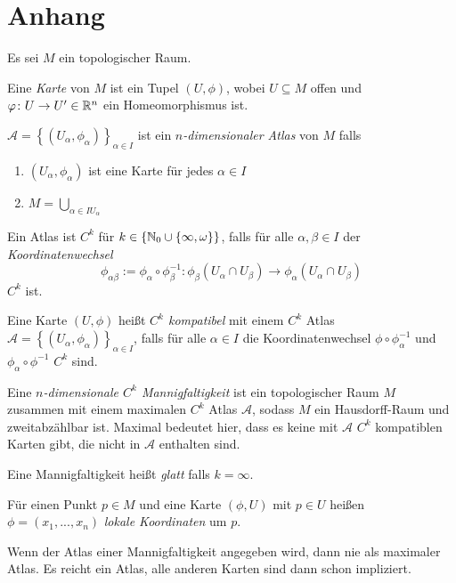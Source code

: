 \chapter{Anhang}

\begin{definition}
    \label{def: mannigfaltigkeit}
    Es sei $M$ ein topologischer Raum. 
    
    Eine \textit{Karte} von $M$ ist ein Tupel
    $(U, \phi)$, wobei $U \subseteq M$ offen und $\varphi \colon U \to U' \in { \mathbb R }^n$ 
    ein Homeomorphismus ist.

    $\mathcal{A} = \left\{ (U_{\alpha}, \phi_{\alpha}) \right\}_{\alpha \in I}$ ist ein 
    \textit{$n$-dimensionaler Atlas} von $M$ falls
    \begin{enumerate}
        \item $(U_{\alpha}, \phi_{\alpha})$ ist eine Karte für jedes $\alpha \in I$
        \item $M = \bigcup_{\alpha \in I U_{\alpha}}$
    \end{enumerate}
    Ein Atlas ist $C^k$ für $k \in \{ { \mathbb N }_0 \cup \{ \infty, \omega \} \}$, falls für
    alle $\alpha, \beta \in I$ der \textit{Koordinatenwechsel} 
    \[ 
        \phi_{\alpha \beta} := 
        \phi_{\alpha} \circ \phi_{\beta}^{-1} \colon 
        \phi_{\beta} (U_{\alpha} \cap U_{\beta}) \to \phi_{\alpha} (U_{\alpha} \cap U_{\beta})
    \]
    $C^k$ ist.
    
    Eine Karte $(U, \phi)$ heißt \textit{$C^k$ kompatibel} mit einem $C^k$ Atlas 
    $\mathcal{A} = \left\{ (U_{\alpha}, \phi_{\alpha}) \right\}_{\alpha \in I}$,
    falls für alle $\alpha \in I$ die Koordinatenwechsel $\phi \circ \phi_{\alpha}^{-1}$
    und $\phi_{\alpha} \circ \phi^{-1}$ $C^k$ sind.

    Eine \textit{$n$-dimensionale $C^k$ Mannigfaltigkeit} ist ein topologischer Raum $M$ 
    zusammen mit einem maximalen $C^k$ Atlas $\mathcal{A}$, sodass $M$ ein Hausdorff-Raum und
    zweitabzählbar ist. Maximal bedeutet hier, dass es keine mit $\mathcal{A}$ $C^k$ 
    kompatiblen Karten gibt, die nicht in $\mathcal{A}$ enthalten sind.

    Eine Mannigfaltigkeit heißt \textit{glatt} falls $k = \infty$.

    Für einen Punkt $p \in M$ und eine Karte $(\phi, U)$ mit $p \in U$ 
    heißen $\phi = (x_1, ..., x_n)$ \textit{lokale Koordinaten} um $p$.
\end{definition}

\begin{remark}
    Wenn der Atlas einer Mannigfaltigkeit angegeben wird, dann nie als maximaler Atlas.
    Es reicht ein Atlas, alle anderen Karten sind dann schon impliziert.
\end{remark}

